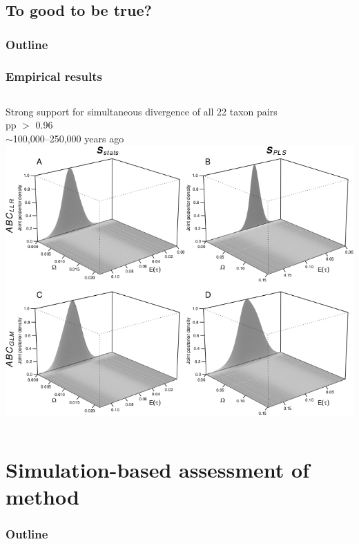 \subsection{To good to be true?}

\begin{frame}
\frametitle{Outline}
\end{frame}

\begin{frame}
    \frametitle{Empirical results}
    \begin{columns}[c]
            {\small
            Strong support for simultaneous divergence of all 22 taxon pairs \\
            \vspace{1cm}
            pp $>$ 0.96 \\
            \vspace{1cm}
            $\sim$100,000--250,000 years ago}
        \includegraphics[width=\textwidth]{images/jointDensityPlots.jpg}
    \end{columns}
\end{frame}

\section{Simulation-based assessment of method}

\begin{frame}
\frametitle{Outline}
\end{frame}

